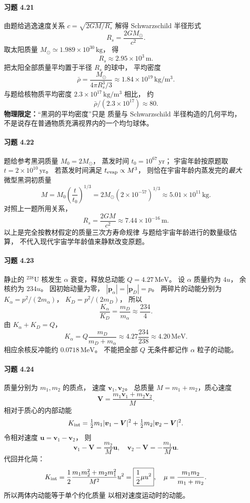 \paragraph{习题 4.21}
由题给逃逸速度关系 \(c=\sqrt{2GM/R_s}\)
解得 Schwarzschild 半径形式
\[
 \boxed{R_s=\frac{2GM_\odot}{c^2}}.
\]
取太阳质量
\(M_\odot\simeq1.989\times10^{30}\,\mathrm{kg}\)，
得
\[
 \boxed{R_s\approx2.95\times10^3\,\mathrm m}.
\]
把太阳全部质量平均置于半径 \(R_s\) 的球中，
平均密度
\[
 \boxed{\bar\rho=\frac{M_\odot}{4\pi R_s^3/3}
 \approx1.84\times10^{19}\,\mathrm{kg/m^3}}.
\]
与题给核物质平均密度
\(2.3\times10^{17}\,\mathrm{kg/m^3}\) 相比，
约
\[
 \boxed{\bar\rho/(2.3\times10^{17})\approx80}.
\]
\textbf{物理限定：}“黑洞的平均密度”只是
质量与 Schwarzschild 半径构造的几何平均，
不是说存在普通物质充满视界内的一个均匀球体。

\paragraph{习题 4.22}
题给参考黑洞质量 \(M_0=2M_\odot\)，
蒸发时间 \(t_0=10^{67}\,\mathrm{yr}\)；
宇宙年龄按原题取
\(t=2\times10^{10}\,\mathrm{yr}\)。
若蒸发时间满足 \(t_{\rm evap}\propto M^3\)，
则恰在宇宙年龄内蒸发完的\emph{最大}微型黑洞初质量
\[
 \boxed{M=M_0\left(\frac t{t_0}\right)^{1/3}
 =2M_\odot(2\times10^{-57})^{1/3}
 \approx5.01\times10^{11}\,\mathrm{kg}}.
\]
对照上一题所用关系，
\[
 \boxed{R_s=\frac{2GM}{c^2}
 \approx7.44\times10^{-16}\,\mathrm m}.
\]
以上是完全按教材假定的质量三次方寿命规律
与题给宇宙年龄进行的数量级估算，
不代入现代宇宙学年龄值来静默改变原题。

\paragraph{习题 4.23}
静止的 \({}^{238}\mathrm U\) 核发生
\(\alpha\) 衰变，释放总动能
\(Q=4.27\,\mathrm{MeV}\)。
设 \(\alpha\) 质量约为 \(4u\)，
余核约为 \(234u\)。
因初始动量为零，
\(|\boldsymbol p_\alpha|
 =|\boldsymbol p_D|=p\)。
两碎片的动能分别为
\(K_\alpha=p^2/(2m_\alpha)\)，
\(K_D=p^2/(2m_D)\)，
所以
\[
 \frac{K_\alpha}{K_D}=\frac{m_D}{m_\alpha}
 \approx\frac{234}{4}.
\]
由 \(K_\alpha+K_D=Q\)，
\[
 \boxed{K_\alpha=Q\frac{m_D}{m_D+m_\alpha}
 \approx4.27\frac{234}{238}
 \approx4.20\,\mathrm{MeV}}.
\]
相应余核反冲能约 \(0.0718\,\mathrm{MeV}\)。
不能把全部 \(Q\) 无条件都记作
\(\alpha\) 粒子的动能。

\paragraph{习题 4.24}
质量分别为 \(m_1,m_2\) 的质点，
速度 \(\boldsymbol v_1,\boldsymbol v_2\)。
总质量 \(M=m_1+m_2\)，质心速度
\[
 \boldsymbol V=\frac{m_1\boldsymbol v_1+m_2\boldsymbol v_2}{M}.
\]
相对于质心的内部动能
\[
 K_{\rm int}=
 \tfrac12m_1|\boldsymbol v_1-\boldsymbol V|^2
 +\tfrac12m_2|\boldsymbol v_2-\boldsymbol V|^2.
\]
令相对速度
\(\boldsymbol u=\boldsymbol v_1-\boldsymbol v_2\)，
则
\[
 \boldsymbol v_1-\boldsymbol V=\frac{m_2}{M}\boldsymbol u,\quad
 \boldsymbol v_2-\boldsymbol V=-\frac{m_1}{M}\boldsymbol u.
\]
代回并化简：
\[
 K_{\rm int}
 =\frac12\frac{m_1m_2^2+m_2m_1^2}{M^2}u^2
 =\boxed{\frac12\mu u^2},\quad
 \mu=\frac{m_1m_2}{m_1+m_2}.
\]
所以两体内动能等于单个约化质量
以相对速度运动时的动能。

